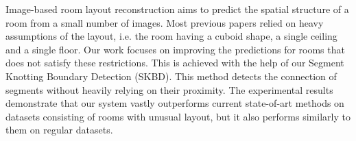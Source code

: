 Image-based room layout reconstruction aims to predict the spatial structure of a room from a small number of images. Most previous papers relied on heavy assumptions of the layout, i.e. the room having a cuboid shape, a single ceiling and a single floor. Our work focuses on improving the predictions for rooms that does not satisfy these restrictions. This is achieved with the help of our Segment Knotting Boundary Detection (SKBD). This method detects the connection of segments without heavily relying on their proximity. The experimental results demonstrate that our system vastly outperforms current state-of-art methods on datasets consisting of rooms with unusual layout, but it also performs similarly to them on regular datasets.
